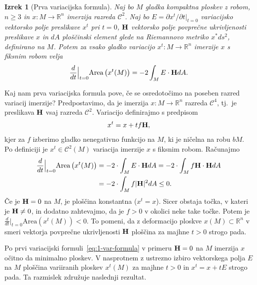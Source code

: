 \documentclass[12pt,a4paper,twoside]{article}
\theoremstyle{definition} %
\theoremstyle{plain} %
\newtheorem{izrek}[definicija]{Izrek}
\numberwithin{equation}{section}  %
\newcommand{\R}{\mathbb R}
\begin{document}
\begin{izrek}[Prva variacijska formula] \label{izr:1-var-formula}
Naj bo $M$ gladka kompaktna ploskev z robom, $n \geq 3$ in $x \colon M \to \R^{n}$ imerzija razreda $\mathcal{C}^2$. Naj bo $E = \partial{x^{t}} / \partial{t}|_{t=0}$ variacijsko vektorsko polje preslikave $x^{t}$ pri $t=0$, $\textbf{\textup{H}}$ vektorsko polje povprečne ukrivljenosti preslikave $x$ in $dA$ ploščinski element glede na Riemannovo metriko $x^{*}ds^2$, definirano na $M$.
Potem za vsako gladko variacijo $x^{t} \colon M \to \R^{n}$ imerzije $x$ s fiksnim robom velja
\begin{equation} \label{eq:1-var-formula}
\frac{d}{dt} \Big|_{t=0} \text{Area} \left(x^{t}(M)\right) = -2 \int_{M} {E \cdot \textbf{\textup{H}} dA}.
\end{equation}
\end{izrek}

Kaj nam prva variacijska formula pove, če se osredotočimo na poseben razred variacij imerzije? Predpostavimo, da je imerzija $x \colon M \to \R^{n}$ razreda $\mathcal{C}^4$, tj.~je preslikava $\textbf{\textup{H}}$ vsaj razreda $\mathcal{C}^2$. Variacijo definirajmo s predpisom
\begin{equation}
x^{t} = x + tf\textbf{\textup{H}},
\end{equation}
kjer za $f$ izberimo gladko nenegativno funkcijo na $M$, ki je ničelna na robu $bM$. Po definiciji je $x^{t} \in \mathcal{C}^2(M)$ variacija imerzije $x$ s fiksnim robom. Računajmo
\begin{align*}
\frac{d}{dt} \Big|_{t=0} \text{Area} \left(x^{t}(M)\right) &= -2 \cdot \int_{M} E \cdot \textbf{\textup{H}} dA = -2 \cdot \int_{M} f \textbf{\textup{H}} \cdot \textbf{\textup{H}} dA \\
&= -2 \cdot \int_{M} f |\textbf{\textup{H}}|^2 dA \leq 0.
\end{align*} 
Če je $\textbf{\textup{H}} = 0$ na $M$, je ploščina konstantna ($x^{t}=x$).
Sicer obstaja točka, v kateri je $\textbf{\textup{H}} \neq 0$, in dodatno zahtevajmo, da je $f>0$ v okolici neke take točke. Potem je $\frac{d}{dt} \Big|_{t=0} \text{Area}(x^{t}(M)) < 0$.
To pomeni, da z deformacijo ploskve $x(M) \subset \mathbb{R}^{n}$ v smeri vektorja povprečne ukrivljenosti $\textbf{\textup{H}}$ ploščina za majhne $t>0$ strogo pada.

Po prvi variacijski formuli~\eqref{eq:1-var-formula} v primeru $\textbf{\textup{H}} = 0$ na $M$ imerzija $x$ očitno da minimalno ploskev. V nasprotnem z ustrezno izbiro vektorskega polja $E$ na $M$ ploščina variiranih ploskev $x^{t}(M)$ za majhne $t>0$ in $x^{t} = x + tE$ strogo pada. Ta razmislek združuje naslednji rezultat.
\end{document}
